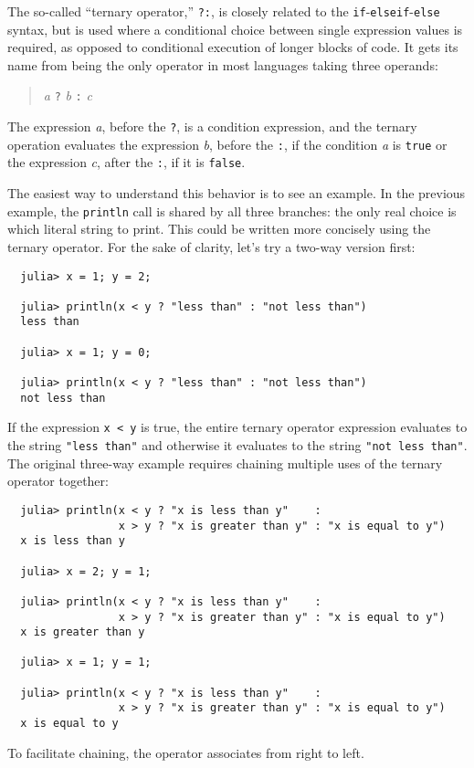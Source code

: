 \documentclass{article}
\begin{document}
The so-called ``ternary operator,'' \verb|?:|, is closely related to the \verb|if|-\verb|elseif|-\verb|else| syntax, but is used where a conditional choice between single expression values is required, as opposed to conditional execution of longer blocks of code.
It gets its name from being the only operator in most languages taking three operands:
\begin{quote}
  \emph{a} \verb|?| \emph{b} \verb|:| \emph{c}
\end{quote}
The expression \emph{a}, before the \verb|?|, is a condition expression, and the ternary operation evaluates the expression \emph{b}, before the \verb|:|, if the condition \emph{a} is \verb|true| or the expression \emph{c}, after the \verb|:|, if it is \verb|false|.

The easiest way to understand this behavior is to see an example.
In the previous example, the \verb|println| call is shared by all three branches:
the only real choice is which literal string to print.
This could be written more concisely using the ternary operator.
For the sake of clarity, let's try a two-way version first:
\begin{verbatim}
  julia> x = 1; y = 2;

  julia> println(x < y ? "less than" : "not less than")
  less than

  julia> x = 1; y = 0;

  julia> println(x < y ? "less than" : "not less than")
  not less than
\end{verbatim}
If the expression \verb|x < y| is true, the entire ternary operator expression evaluates to the string \verb|"less than"| and otherwise it evaluates to the string \verb|"not less than"|.
The original three-way example requires chaining multiple uses of the ternary operator together:
\begin{verbatim}
  julia> println(x < y ? "x is less than y"    :
                 x > y ? "x is greater than y" : "x is equal to y")
  x is less than y

  julia> x = 2; y = 1;

  julia> println(x < y ? "x is less than y"    :
                 x > y ? "x is greater than y" : "x is equal to y")
  x is greater than y

  julia> x = 1; y = 1;

  julia> println(x < y ? "x is less than y"    :
                 x > y ? "x is greater than y" : "x is equal to y")
  x is equal to y
\end{verbatim}
To facilitate chaining, the operator associates from right to left.
\end{document}
